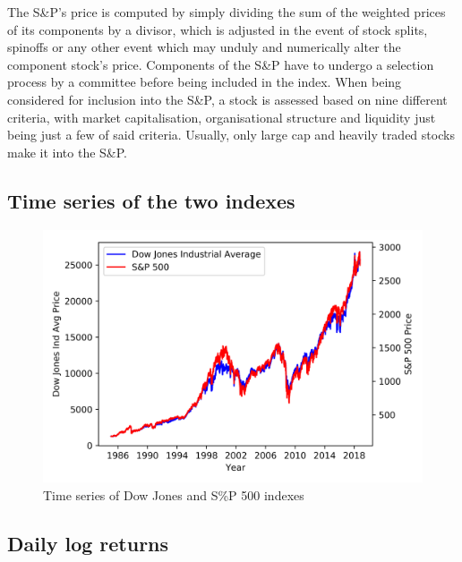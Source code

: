 \documentclass[a4paper]{article}
\begin{document}
The S\&P’s price is computed by simply dividing the sum of the weighted prices of its components by a divisor, which is adjusted in the event of stock splits, spinoffs or any other event which may unduly and numerically alter the component stock’s price. Components of the S\&P have to undergo a selection process by a committee before being included in the index.  When being considered for inclusion into the S\&P, a stock is assessed based on nine different criteria, with market capitalisation, organisational structure and liquidity just being just a few of said criteria. Usually, only large cap and heavily traded stocks make it into the S\&P.

\subsection{Time series of the two indexes}

\begin{figure}[h]
	\includegraphics[width=\linewidth]{time_series.png}
	\caption{Time series of Dow Jones and S\%P 500 indexes}
\end{figure}

\newpage
\subsection{Daily log returns}
\end{document}
